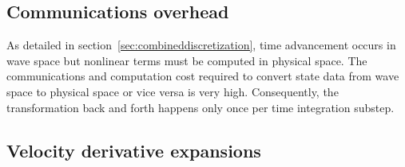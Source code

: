 \documentclass[letterpaper,11pt,nointlimits,reqno,draft]{amsart}
\begin{document}
\subsection{Communications overhead}
\label{sec:commoverhead}

As detailed in section~\ref{sec:combineddiscretization}, time advancement
occurs in wave space but nonlinear terms must be computed in physical space.
The communications and computation cost required to convert state data from
wave space to physical space or vice versa is very high.  Consequently, the
transformation back and forth happens only once per time integration substep.

\subsection{Velocity derivative expansions}
\label{velocity_derivative_expansions}
\end{document}
